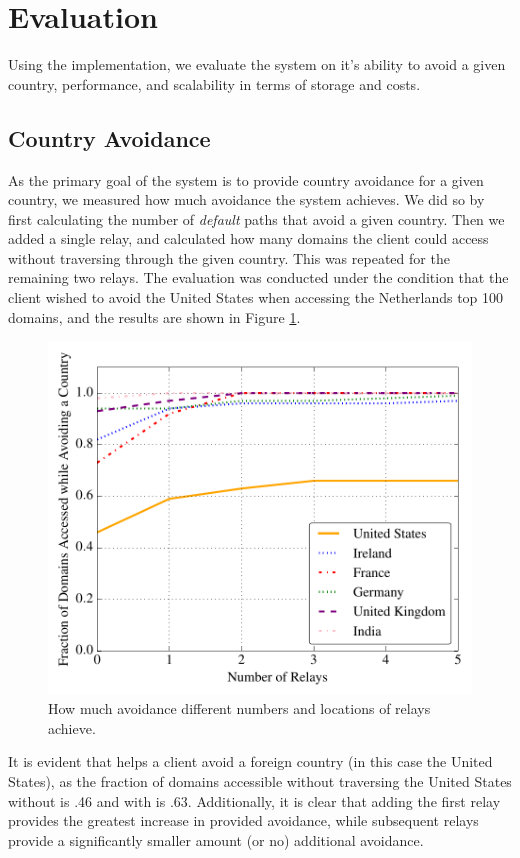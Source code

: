 \section{Evaluation}
Using the \system{} implementation, we evaluate the system on it's ability to avoid a given country, performance, and scalability in terms of storage and costs.

\subsection{Country Avoidance}
As the primary goal of the system is to provide country avoidance for a given 
country, we measured how much avoidance the system achieves.  We did so by first 
calculating the number of {\it default} paths that avoid a given country.  Then 
we added a single relay, and calculated how many domains the client could 
access without traversing through the given country.  This was repeated for 
the remaining two relays.  The evaluation was conducted under the condition that 
the client wished to avoid the United States when accessing the Netherlands top 
100 domains, and the results are shown in Figure \ref{fig:avoidance_eval}.

\begin{figure}[b!]
\centering
\includegraphics[width=.5\textwidth]{avoidance_n_relays}
\caption{How much avoidance different numbers and locations of relays achieve.}
\label{fig:avoidance_eval}
\end{figure}

It is evident that \system{} helps a client avoid a foreign country (in this case 
the United States), as the fraction of domains accessible without traversing 
the United States without \system{} is .46 and with \system{} is .63.  Additionally, 
it is clear that adding the first relay provides the greatest increase in 
provided avoidance, while subsequent relays provide a significantly 
smaller amount (or no) additional avoidance.

